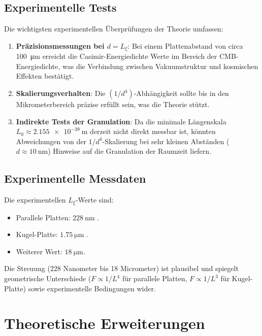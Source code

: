 \documentclass[12pt,a4paper]{article}
\begin{document}
	\subsection{Experimentelle Tests}
	
	Die wichtigsten experimentellen Überprüfungen der Theorie umfassen:
	
	\begin{enumerate}
		\item \textbf{Präzisionsmessungen bei \( d = L_\xi \)}: Bei einem Plattenabstand von circa \SI{100}{\micro\meter} erreicht die Casimir-Energiedichte Werte im Bereich der CMB-Energiedichte, was die Verbindung zwischen Vakuumstruktur und kosmischen Effekten bestätigt.
		\item \textbf{Skalierungsverhalten}: Die \( (1/d^4) \)-Abhängigkeit sollte bis in den Mikrometerbereich präzise erfüllt sein, was die Theorie stützt.
		\item \textbf{Indirekte Tests der Granulation}: Da die minimale Längenskala \( L_0 \approx \SI{2.155e-39}{\meter} \) derzeit nicht direkt messbar ist, könnten Abweichungen von der \( 1/d^4 \)-Skalierung bei sehr kleinen Abständen (\( d \approx \SI{10}{\nano\meter} \)) Hinweise auf die Granulation der Raumzeit liefern.
	\end{enumerate}
	
	\subsection{Experimentelle Messdaten}
	
	Die experimentellen \( L_\xi \)-Werte sind:
	\begin{itemize}
		\item Parallele Platten: \( \SI{228}{\nano\meter} \) \cite{dhital2024}.
		\item Kugel-Platte: \( \SI{1.75}{\micro\meter} \) \cite{xu2022}.
		\item Weiterer Wert: \( \SI{18}{\micro\meter} \).
	\end{itemize}
	
	Die Streuung (228 Nanometer bis 18 Micrometer) ist plausibel und spiegelt geometrische Unterschiede (\( F \propto 1/L^4 \) für parallele Platten, \( F \propto 1/L^3 \) für Kugel-Platte) sowie experimentelle Bedingungen wider.
	
	\section{Theoretische Erweiterungen}
	
\end{document}
